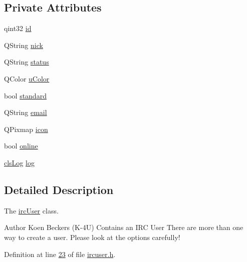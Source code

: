 \subsection*{Private Attributes}
\begin{DoxyCompactItemize}
\item 
qint32 \hyperlink{classclient_1_1irc_user_a650c7744e4a6a7ffbaa0f699ba71ed1d}{id}
\item 
Q\-String \hyperlink{classclient_1_1irc_user_a142534dfbf6f70067fdfa757e0758380}{nick}
\item 
Q\-String \hyperlink{classclient_1_1irc_user_a71be3d4ca53a96871ebc584f1351aa02}{status}
\item 
Q\-Color \hyperlink{classclient_1_1irc_user_a13123b613f595f9d47bf172641be9d8a}{u\-Color}
\item 
bool \hyperlink{classclient_1_1irc_user_a623bda8de196cde55e9a0ab3298e818f}{standard}
\item 
Q\-String \hyperlink{classclient_1_1irc_user_a6bdc381efdca6c1ab4bd4bdc3bcb4bb9}{email}
\item 
Q\-Pixmap \hyperlink{classclient_1_1irc_user_adfd6c8d3a595b6ad3eeb2eec1b57f5fb}{icon}
\item 
bool \hyperlink{classclient_1_1irc_user_ac20bc8cf5f9fda9c39f15dff37c115b8}{online}
\item 
\hyperlink{class_k4_u_1_1cls_log}{cls\-Log} \hyperlink{classclient_1_1irc_user_a538637b8b76561d02dc0a0ee98f91264}{log}
\end{DoxyCompactItemize}


\subsection{Detailed Description}
The \hyperlink{classclient_1_1irc_user}{irc\-User} class. 

\begin{DoxyAuthor}{Author}
Koen Beckers (K-\/4\-U) Contains an I\-R\-C User There are more than one way to create a user. Please look at the options carefully! 
\end{DoxyAuthor}


Definition at line \hyperlink{custom_irc_client_2ircuser_8h_source_l00023}{23} of file \hyperlink{custom_irc_client_2ircuser_8h_source}{ircuser.\-h}.



